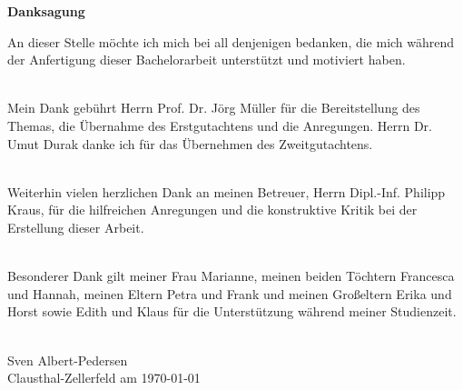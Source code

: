 \newpage
\thispagestyle{empty}
\begin{center}
\LARGE\bfseries Danksagung\linebreak[4]
\end{center}


An dieser Stelle möchte ich mich bei all denjenigen bedanken, die mich während der Anfertigung dieser Bachelorarbeit unterstützt und motiviert haben. \\\

Mein Dank gebührt Herrn Prof. Dr. Jörg Müller für die Bereitstellung des Themas, die Übernahme des Erstgutachtens und die Anregungen.
Herrn Dr. Umut Durak danke ich für das Übernehmen des Zweitgutachtens. \\\

Weiterhin vielen herzlichen Dank an meinen Betreuer, Herrn Dipl.-Inf. Philipp Kraus, für die hilfreichen Anregungen und die konstruktive Kritik bei der Erstellung dieser Arbeit. \\\

Besonderer Dank gilt meiner Frau Marianne, meinen beiden Töchtern Francesca und Hannah, meinen Eltern Petra und Frank und meinen Großeltern Erika und Horst sowie Edith und Klaus für die Unterstützung während meiner Studienzeit.  \\\


Sven Albert-Pedersen\\
Clausthal-Zellerfeld am \today
